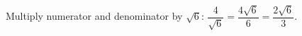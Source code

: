 Multiply numerator and denominator by $\sqrt6$: $\dfrac{4}{\sqrt6}=\dfrac{4\sqrt6}{6}=\boxed{\dfrac{2\sqrt6}{3}}$.
